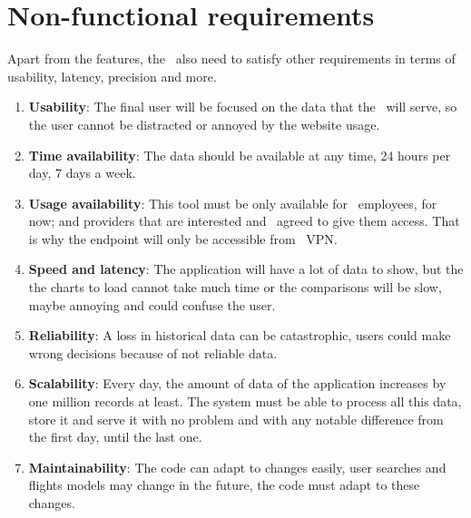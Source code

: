 
\section{Non-functional requirements}

Apart from the features, the \thesis\ also need to satisfy other requirements in terms of usability, latency, precision and more.

\begin{enumerate}
    \item \textbf{Usability}: The final user will be focused on the data that the \thesis\ will serve, so the user cannot be distracted or annoyed by the website usage.
    \\
    \item \textbf{Time availability}: The data should be available at any time, 24 hours per day, 7 days a week.
    \\
    \item \textbf{Usage availability}: This tool must be only available for \company\ employees, for now; and providers that are interested and \company\ agreed to give them access. That is why the endpoint will only be accessible from \company\ VPN\cite{palo_alto_networks}.
    \\
    \item \textbf{Speed and latency}: The application will have a lot of data to show, but the the charts to load cannot take much time or the comparisons will be slow, maybe annoying and could confuse the user.
    \\
    \item \textbf{Reliability}: A loss in historical data can be catastrophic, users could make wrong decisions because of not reliable data.
    \\
    \item \textbf{Scalability}: Every day, the amount of data of the application increases by one million records at least. The system must be able to process all this data, store it and serve it with no problem and with any notable difference from the first day, until the last one.
    \\
    \item \textbf{Maintainability}: The code can adapt to changes easily, user searches and flights models may change in the future, the code must adapt to these changes.
\end{enumerate}


